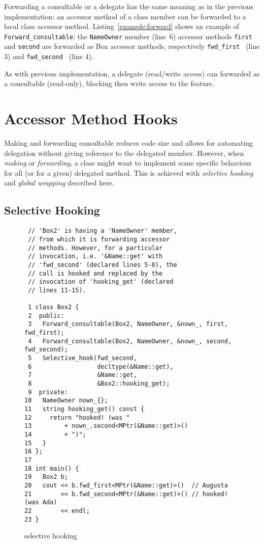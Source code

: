 \documentclass{article}
\begin{document}
Forwarding a consultable or a delegate has the same meaning as in the previous implementation: an accessor method of a class member can be forwarded to a local class accessor method. Listing~\ref{example:forward} shows an example of \texttt{Forward\_consultable}: the \texttt{NameOwner} member (line~6) accessor methods \texttt{first} and \texttt{second} are forwarded as Box accessor methods, respectively \texttt{fwd\_first } (line 3) and \texttt{fwd\_second } (line 4).

As with previous implementation, a delegate (read/write access) can forwarded as a consultable (read-only), blocking then write access to the feature.  


\section{Accessor Method Hooks}
Making and forwarding consultable reduces code size and allows for automating delegation without giving reference to the delegated member. However, when \textit{making} or \textit{forwarding}, a class might want to implement some specific behaviour for all (or for a given) delegated method. This is achieved with \textit{selective hooking} and \textit{global wrapping} described here. 

\subsection{Selective Hooking}

\begin{figure}[ht]
{\small
\begin{lstlisting}
 // 'Box2' is having a 'NameOwner' member,
 // from which it is forwarding accessor 
 // methods. However, for a particular
 // invocation, i.e. '&Name::get' with 
 // 'fwd_second' (declared lines 5-8), the 
 // call is hooked and replaced by the 
 // invocation of 'hooking_get' (declared 
 // lines 11-15).

 1 class Box2 {
 2  public:
 3   Forward_consultable(Box2, NameOwner, &nown_, first, fwd_first);
 4   Forward_consultable(Box2, NameOwner, &nown_, second, fwd_second);
 5   Selective_hook(fwd_second,
 6                  decltype(&Name::get),
 7                  &Name::get,
 8                  &Box2::hooking_get);
 9  private:
10   NameOwner nown_{};
11   string hooking_get() const {
12     return "hooked! (was "
13         + nown_.second<MPtr(&Name::get)>()
14         + ")";
15   }
16 };
17 
18 int main() {
19   Box2 b;
20   cout << b.fwd_first<MPtr(&Name::get)>()  // Augusta
21        << b.fwd_second<MPtr(&Name::get)>() // hooked! (was Ada)
22        << endl; 
23 }
\end{lstlisting}}
\cprotect\caption{selective hooking}
\label{example:selective_hook}
\end{figure}
\end{document}
